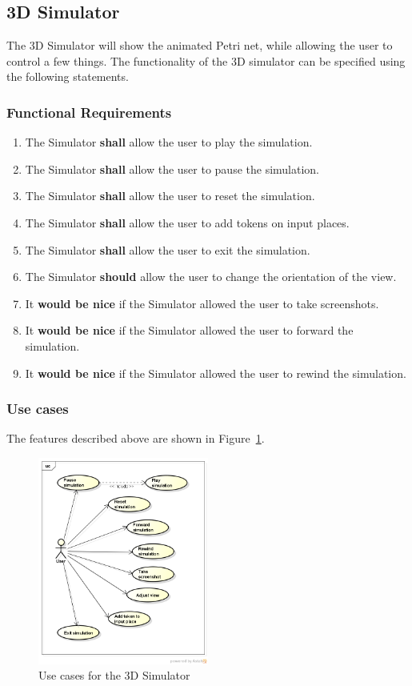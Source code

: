 \subsection{3D Simulator}
\label{sec:sf-simulator}

The 3D Simulator will show the animated Petri net, while allowing the user to control a few things. The functionality of the 3D simulator can be specified using the following statements.

\subsubsection{Functional Requirements}
\begin{enumerate}
\item The Simulator \textbf{shall} allow the user to play the simulation.
\item The Simulator \textbf{shall} allow the user to pause the simulation.
\item The Simulator \textbf{shall} allow the user to reset the simulation.
\item The Simulator \textbf{shall} allow the user to add tokens on input places.
\item The Simulator \textbf{shall} allow the user to exit the simulation.
\item The Simulator \textbf{should} allow the user to change the orientation of the view.
\item It \textbf{would be nice} if the Simulator allowed the user to take screenshots.
\item It \textbf{would be nice} if the Simulator allowed the user to forward the simulation.
\item It \textbf{would be nice} if the Simulator allowed the user to rewind the simulation.
\end{enumerate}

\subsubsection{Use cases}

The features described above are shown in Figure~\ref{fig:use-cases-simulator}.

\begin{figure}[htp]
\begin{center}
  \includegraphics[width=0.5\textwidth]{image/uc-simulator.png}
  \caption{Use cases for the 3D Simulator}
  \label{fig:use-cases-simulator}
\end{center}
\end{figure}